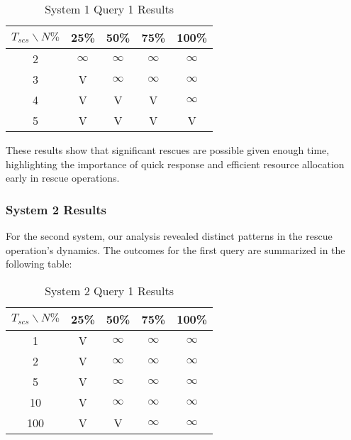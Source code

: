 \begin{table}[H]
	\centering
	\small
	\begin{tabular}{|c|c|c|c|c|}
		\hline
		$T_{scs}\backslash N\%$ & 25\% & 50\% & 75\% & 100\% \\ \hline
		2                       & $\infty$   & $\infty$   & $\infty$   & $\infty$    \\ \hline
		3                       & V   & $\infty$   & $\infty$   & $\infty$    \\ \hline
		4                       & V   & V   & V   & $\infty$    \\ \hline
		5                       & V   & V   & V   & V    \\ \hline
	\end{tabular}
	\caption{System 1 Query 1 Results}
	\label{tab:system1}
	\normalsize
\end{table}

These results show that significant rescues are possible given enough time, highlighting the importance of quick response and efficient resource allocation early in rescue operations.

\subsubsection{System 2 Results}
For the second system, our analysis revealed distinct patterns in the rescue operation's dynamics. 
The outcomes for the first query are summarized in the following table:

\begin{table}[H]
	\centering
	\small
	\begin{tabular}{|c|c|c|c|c|}
		\hline
		$T_{scs}\backslash N\%$ & 25\% & 50\% & 75\% & 100\% \\ \hline
		1                     & V   & $\infty$  & $\infty$   &$\infty$    \\ \hline
		2                       & V   & $\infty$  & $\infty$   &$\infty$    \\ \hline
		5                      & V   & $\infty$  & $\infty$   &$\infty$    \\ \hline
		10                      & V   & $\infty$  & $\infty$   &$\infty$    \\ \hline
		100                       & V   & V  & $\infty$   &$\infty$    \\ \hline
	\end{tabular}
	\caption{System 2 Query 1 Results}
	\label{tab:system1}
	\normalsize
\end{table}

